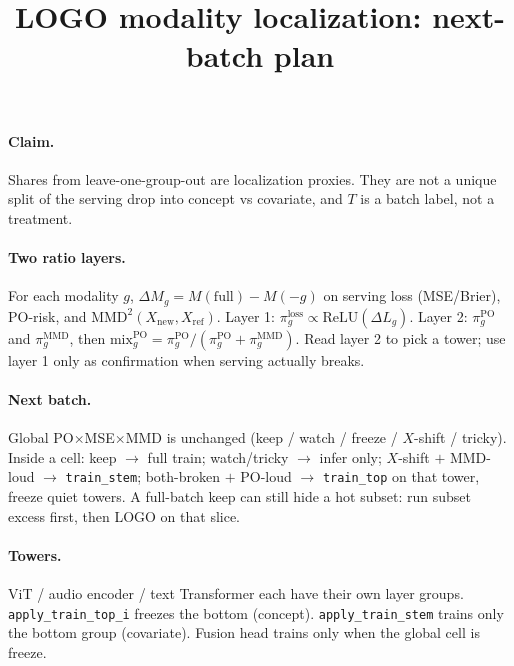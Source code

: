\documentclass[11pt]{article}
\title{LOGO modality localization: next-batch plan}
\author{}
\date{}
\begin{document}
\maketitle
\thispagestyle{empty}

\paragraph{Claim.}
Shares from leave-one-group-out are localization proxies.
They are not a unique split of the serving drop into concept vs covariate,
and $T$ is a batch label, not a treatment.

\paragraph{Two ratio layers.}
For each modality $g$,
$\Delta M_g = M(\mathrm{full})-M(-g)$ on serving loss (MSE/Brier),
PO-risk, and $\mathrm{MMD}^2(X_{\mathrm{new}},X_{\mathrm{ref}})$.
Layer 1: $\pi^{\mathrm{loss}}_g \propto \mathrm{ReLU}(\Delta L_g)$.
Layer 2: $\pi^{\mathrm{PO}}_g$ and $\pi^{\mathrm{MMD}}_g$, then
$\mathrm{mix}^{\mathrm{PO}}_g = \pi^{\mathrm{PO}}_g/(\pi^{\mathrm{PO}}_g+\pi^{\mathrm{MMD}}_g)$.
Read layer 2 to pick a tower; use layer 1 only as confirmation when serving actually breaks.

\paragraph{Next batch.}
Global PO$\times$MSE$\times$MMD is unchanged
(keep / watch / freeze / $X$-shift / tricky).
Inside a cell: keep $\to$ full train;
watch/tricky $\to$ infer only;
$X$-shift $+$ MMD-loud $\to$ \texttt{train\_stem};
both-broken $+$ PO-loud $\to$ \texttt{train\_top} on that tower, freeze quiet towers.
A full-batch keep can still hide a hot subset: run subset excess first, then LOGO on that slice.

\paragraph{Towers.}
ViT / audio encoder / text Transformer each have their own layer groups.
\texttt{apply\_train\_top\_i} freezes the bottom (concept).
\texttt{apply\_train\_stem} trains only the bottom group (covariate).
Fusion head trains only when the global cell is freeze.
\end{document}
